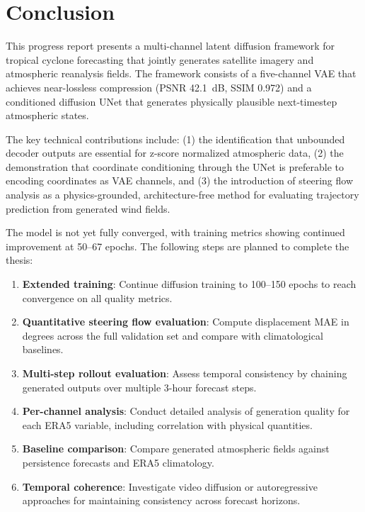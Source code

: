 \section{Conclusion}

This progress report presents a multi-channel latent diffusion framework for tropical cyclone forecasting that jointly generates satellite imagery and atmospheric reanalysis fields. The framework consists of a five-channel VAE that achieves near-lossless compression (PSNR 42.1~dB, SSIM 0.972) and a conditioned diffusion UNet that generates physically plausible next-timestep atmospheric states.

The key technical contributions include: (1) the identification that unbounded decoder outputs are essential for z-score normalized atmospheric data, (2) the demonstration that coordinate conditioning through the UNet is preferable to encoding coordinates as VAE channels, and (3) the introduction of steering flow analysis as a physics-grounded, architecture-free method for evaluating trajectory prediction from generated wind fields.

The model is not yet fully converged, with training metrics showing continued improvement at 50--67 epochs. The following steps are planned to complete the thesis:

\begin{enumerate}
\item \textbf{Extended training}: Continue diffusion training to 100--150 epochs to reach convergence on all quality metrics.
\item \textbf{Quantitative steering flow evaluation}: Compute displacement MAE in degrees across the full validation set and compare with climatological baselines.
\item \textbf{Multi-step rollout evaluation}: Assess temporal consistency by chaining generated outputs over multiple 3-hour forecast steps.
\item \textbf{Per-channel analysis}: Conduct detailed analysis of generation quality for each ERA5 variable, including correlation with physical quantities.
\item \textbf{Baseline comparison}: Compare generated atmospheric fields against persistence forecasts and ERA5 climatology.
\item \textbf{Temporal coherence}: Investigate video diffusion \cite{ren2025improving} or autoregressive approaches for maintaining consistency across forecast horizons.
\end{enumerate}

